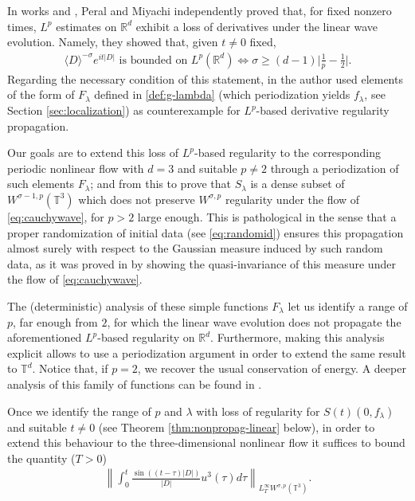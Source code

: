 \documentclass[a4paper, reqno, 11pt]{amsart}
\theoremstyle{definition}
\begin{document}
\hfill \break

In works \cite{Peral1980} and \cite{Miyachi1980}, Peral and Miyachi independently proved that, for fixed nonzero times, $L^p$ estimates on $\mathbb{R}^d$ exhibit a loss of derivatives under the linear wave evolution. Namely, they showed that, given $t \neq 0$ fixed,
\begin{align*}
\langle D \rangle^{-\sigma}e^{it|D|} \text{ is bounded on } L^p(\mathbb{R}^d) \Longleftrightarrow \sigma \geq (d-1) \Big| \frac{1}{p} - \frac{1}{2} \Big|.
\end{align*}
Regarding the necessary condition of this statement, in \cite{Peral1980} the author used elements of the form of $F_{\lambda}$ defined in \ref{def:g-lambda} (which periodization yields $f_{\lambda}$, see Section \ref{sec:localization}) as counterexample for $L^p$-based derivative regularity propagation. 
\hfill \break

Our goals are to extend this loss of $L^p$-based regularity to the corresponding periodic nonlinear flow with $d = 3$ and suitable $p \neq 2$ through a periodization of such elements $F_{\lambda}$; and from this to prove that $S_{\lambda}$ is a dense subset of $W^{\sigma-1,p}(\mathbb{T}^3)$ which does not preserve $W^{\sigma,p}$ regularity under the flow of \eqref{eq:cauchywave}, for $p > 2$ large enough. This is pathological in the sense that a proper randomization of initial data (see \eqref{eq:randomid}) ensures this propagation almost surely with respect to the Gaussian measure induced by such random data, as it was proved in \cite{GOTW22} by showing the quasi-invariance of this measure under the flow of \eqref{eq:cauchywave}. 


The (deterministic) analysis of these simple functions $F_{\lambda}$ let us identify a range of $p$, far enough from $2$, for which the linear wave evolution does not propagate the aforementioned $L^p$-based regularity on $\mathbb{R}^d$. Furthermore, making this analysis explicit allows to use a periodization argument in order to extend the same result to $\mathbb{T}^d$. Notice that, if $p = 2$, we recover the usual conservation of energy. A deeper analysis of this family of functions can be found in \cite{W65}. 

Once we identify the range of $p$ and $\lambda$ with loss of regularity for $S(t)(0,f_{\lambda})$ and suitable $t \neq 0$ (see Theorem \ref{thm:nonpropag-linear} below), in order to extend this behaviour to the three-dimensional nonlinear flow it suffices to bound the quantity ($T > 0$)
	\begin{align}\label{eq:quantity-to-control}
		\left\| \int_0^t \frac{\sin((t-\tau)|D|)}{|D|} u^3(\tau) d\tau \right\|_{L^{\infty}_T W^{\sigma,p}(\mathbb{T}^3)}.
	\end{align} 
	
\end{document}
